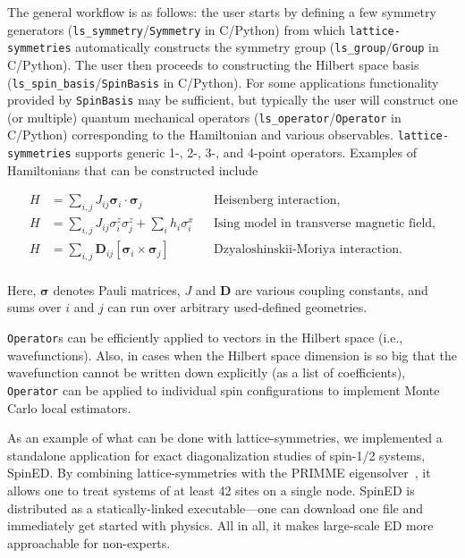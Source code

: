 The general workflow is as follows: the user starts by defining a few symmetry generators (\texttt{ls\_symmetry}/\texttt{Symmetry} in C/Python) from which \texttt{lattice-symmetries} automatically constructs the symmetry group (\texttt{ls\_group}/\texttt{Group} in C/Python). The user then proceeds to constructing the Hilbert space basis (\texttt{ls\_spin\_basis}/\texttt{SpinBasis} in C/Python). For some applications functionality provided by \texttt{SpinBasis} may be sufficient, but typically the user will construct one (or multiple) quantum mechanical operators (\texttt{ls\_operator}/\texttt{Operator} in C/Python) corresponding to the Hamiltonian and various observables. \texttt{lattice-symmetries} supports generic 1-, 2-, 3-, and 4-point operators. Examples of Hamiltonians that can be constructed include

\begin{equation*}
\begin{aligned}
    H &= \sum_{i, j} J_{ij} \boldsymbol\sigma_i \cdot \boldsymbol\sigma_j && \text{Heisenberg interaction,} \\
    H &= \sum_{i, j} J_{ij} \sigma^z_i \sigma^z_j + \sum_i h_i \sigma^x_i && \text{Ising model in transverse magnetic field,} \\
    H &= \sum_{i, j} \mathbf{D}_{ij} \left[ \boldsymbol\sigma_i \times \boldsymbol\sigma_j \right] && \text{Dzyaloshinskii-Moriya interaction.} \\
\end{aligned}
\end{equation*}

Here, $\boldsymbol\sigma$ denotes Pauli matrices, $J$ and $\mathbf{D}$ are various coupling constants, and sums over $i$ and $j$ can run over arbitrary used-defined geometries.

\texttt{Operator}s can be efficiently applied to vectors in the Hilbert space (i.e., wavefunctions). Also, in cases when the Hilbert space dimension is so big that the wavefunction cannot be written down explicitly (as a list of coefficients), \texttt{Operator} can be applied to individual spin configurations to implement Monte Carlo local estimators.

As an example of what can be done with lattice-symmetries, we implemented a standalone application for exact diagonalization studies of spin-1/2 systems, SpinED. By combining lattice-symmetries with the PRIMME eigensolver~\cite{Statho2010Primme}, it allows one to treat systems of at least 42 sites on a single node. SpinED is distributed as a statically-linked executable---one can download one file and immediately get started with physics. All in all, it makes large-scale ED more approachable for non-experts.

